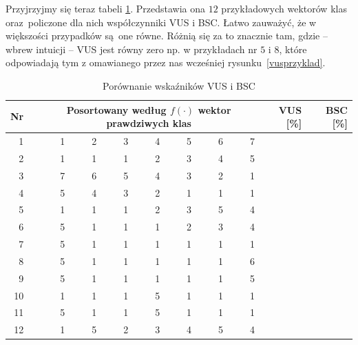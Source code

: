 \documentclass{mini}
\begin{document}
Przyjrzyjmy się teraz tabeli \ref{bsc}. Przedstawia ona $12$ przykładowych wektorów klas oraz~policzone dla nich współczynniki VUS i BSC. Łatwo zauważyć, że w większości przypadków są~one równe. Różnią się za to znacznie tam, gdzie -- wbrew intuicji -- VUS jest równy zero np. w przykładach nr $5$ i $8$, które odpowiadają tym z omawianego przez nas wcześniej rysunku~\ref{vusprzyklad}. 

\begin{table}[ht]
\centering
\begin{tabular}{rrrrrrrrrrr}
  \hline
Nr && \multicolumn{7}{c}{\parbox{4cm}{\centering\vspace{2mm}Posortowany według $f(\cdot)$ wektor prawdziwych klas\vspace{2mm}}}   & VUS [\%] & BSC [\%] \\ 
  \hline
1&&  1 &   2 &   3 &   4 &   5 &   6 &   7 & \color{red}{100,00} & \color{blue}{100.00} \\ 
2& &   1 &   1 &   1 &   2 &   3 &   4 &   5 & \color{red}{100,00} & \color{blue}{100,00} \\ 
3& &   7 &   6 &   5 &   4 &   3 &   2 &   1 & \color{red}{0,00} & \color{blue}{0,00} \\ 
4& &   5 &   4 &   3 &   2 &   1 &   1 &   1 & \color{red}{0,00} & \color{blue}{0,00} \\ 
5& &   1 &   1 &   1 &   2 &   3 &   5 &   4 & \color{red}{0,00} & \color{blue}{94,44} \\ 
6&&    5 &   1 &   1 &   1 &   2 &   3 &   4 & \color{red}{0,00} & \color{blue}{66,67} \\ 
7& &   5 &   1 &   1 &   1 &   1 &   1 &   1 & \color{red}{0,00} & \color{blue}{0,00} \\ 
8& &   5 &   1 &   1 &   1 &   1 &   1 &   6 & \color{red}{0,00} & \color{blue}{54,55} \\ 
9&&    5 &   1 &   1 &   1 &   1 &   1 &   5 & \color{red}{50,00} & \color{blue}{50,00} \\ 
10&&    1 &   1 &   1 &   5 &   1 &   1 &   1 & \color{red}{50,00} & \color{blue}{50,00} \\ 
11& &   5 &   1 &   1 &   5 &   1 &   1 &   1 & \color{red}{20,00} & \color{blue}{20,00} \\ 
12&&    1 &   5 &   2 &   3 &   4 &   5 &   4 & \color{red}{25,00} & \color{blue}{73,68} \\ 
   \hline
\end{tabular}
\caption{Porównanie wskaźników VUS i BSC}
\label{bsc}
\end{table}
\end{document}
